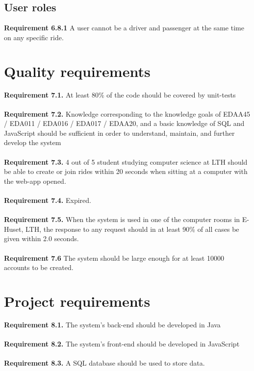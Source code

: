 \documentclass{article}
\begin{document}
\subsection{User roles}
\textbf{Requirement 6.8.1} A user cannot be a driver and passenger at the same time on any specific ride.

\section{Quality requirements}
\textbf{Requirement 7.1.} At least 80\% of the code should be covered by unit-tests
\\ \\
\textbf{Requirement 7.2.} Knowledge corresponding to the knowledge goals of EDAA45 / EDA011 / EDA016 / EDA017 / EDAA20, and a basic knowledge of SQL and JavaScript should be sufficient in order to understand, maintain, and further develop the system
\\ \\
\textbf{Requirement 7.3.} 4 out of 5 student studying computer science at LTH should be able to create or join rides within 20 seconds when sitting at a computer with the web-app opened.
\\ \\
\textbf{Requirement 7.4.} Expired.
\\ \\
\textbf{Requirement 7.5.} When the system is used in one of the computer rooms in E-Huset, LTH, the response to any request should in at least 90\% of all cases be given within 2.0 seconds.
\\ \\
\textbf{Requirement 7.6} The system should be large enough for at least
10000 accounts to be created.



\section{Project requirements}


\textbf{Requirement 8.1.} The system's back-end should be developed in Java
\\ \\
\textbf{Requirement 8.2.} The system's front-end should be developed in JavaScript
\\ \\
\textbf{Requirement 8.3.} A SQL database should be used to store data.
\end{document}
